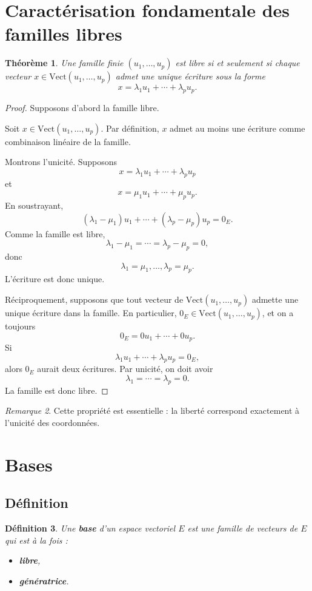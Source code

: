 \documentclass[11pt,a4paper]{article}
\newtheorem{definition}{Définition}[section]
\newtheorem{theoreme}[definition]{Théorème}
\theoremstyle{remark}
\newtheorem{remarque}[definition]{Remarque}
\newcommand{\Vect}{\mathrm{Vect}}
\begin{document}
\section{Caractérisation fondamentale des familles libres}

\begin{theoreme}
Une famille finie \((u_1,\dots,u_p)\) est libre si et seulement si chaque vecteur \(x\in \Vect(u_1,\dots,u_p)\) admet une unique écriture sous la forme
\[
x=\lambda_1u_1+\cdots+\lambda_pu_p.
\]
\end{theoreme}

\begin{proof}
Supposons d’abord la famille libre.

Soit \(x\in \Vect(u_1,\dots,u_p)\). Par définition, \(x\) admet au moins une écriture comme combinaison linéaire de la famille.

Montrons l’unicité. Supposons
\[
x=\lambda_1u_1+\cdots+\lambda_pu_p
\]
et
\[
x=\mu_1u_1+\cdots+\mu_pu_p.
\]
En soustrayant,
\[
(\lambda_1-\mu_1)u_1+\cdots+(\lambda_p-\mu_p)u_p=0_E.
\]
Comme la famille est libre,
\[
\lambda_1-\mu_1=\cdots=\lambda_p-\mu_p=0,
\]
donc
\[
\lambda_1=\mu_1,\dots,\lambda_p=\mu_p.
\]
L’écriture est donc unique.

Réciproquement, supposons que tout vecteur de \(\Vect(u_1,\dots,u_p)\) admette une unique écriture dans la famille. En particulier, \(0_E\in \Vect(u_1,\dots,u_p)\), et on a toujours
\[
0_E=0u_1+\cdots+0u_p.
\]
Si
\[
\lambda_1u_1+\cdots+\lambda_pu_p=0_E,
\]
alors \(0_E\) aurait deux écritures. Par unicité, on doit avoir
\[
\lambda_1=\cdots=\lambda_p=0.
\]
La famille est donc libre.
\end{proof}

\begin{remarque}
Cette propriété est essentielle : la liberté correspond exactement à l’unicité des coordonnées.
\end{remarque}

\section{Bases}

\subsection{Définition}

\begin{definition}
Une \textbf{base} d’un espace vectoriel \(E\) est une famille de vecteurs de \(E\) qui est à la fois :
\begin{itemize}
    \item \textbf{libre},
    \item \textbf{génératrice}.
\end{itemize}
\end{definition}
\end{document}
